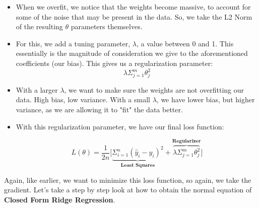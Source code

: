 \documentclass{article}
\begin{document}
\begin{itemize}

    \item When we overfit, we notice that the weights become massive, to account for some of the noise that may be present in the data. So, we take the L2 Norm of the resulting $\theta$ parameters themselves.
    
    \item For this, we add a tuning parameter, $\lambda$, a value between 0 and 1. This essentially is the magnitude of consideration we give to the aforementioned coefficients (our bias). This gives us a regularization parameter:
    $$\lambda\Sigma^m_{j=1}\theta_j^2$$
    
    \item With a larger $\lambda$, we want to make sure the weights are not overfitting our data. High bias, low variance. With a small $\lambda$, we have lower bias, but higher variance, as we are allowing it to "fit" the data better.
    
    \item With this regularization parameter, we have our final loss function:
        
        $$L(\theta) = \frac{1}{2n}\bigg[\underbrace{\Sigma^n_{i=1}(\hat{y}_i - y_i)^2}_\textbf{Least Squares} + \overbrace{\lambda\Sigma^m_{j=1}\theta_j^2}^\textbf{Regularizer}\bigg]$$
\end{itemize}
Again, like earlier, we want to minimize this loss function, so again, we take the gradient. Let's take a step by step look at how to obtain the normal equation of \textbf{Closed Form Ridge Regression}. 
\end{document}

